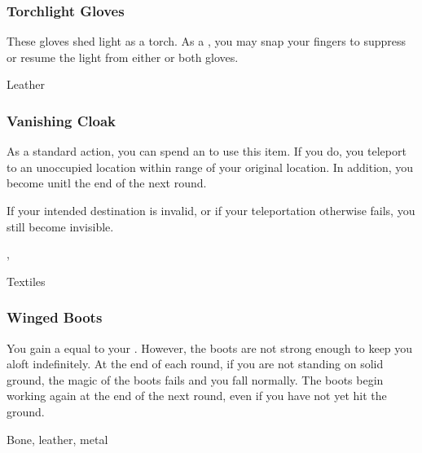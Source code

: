 \lowercase{\hypertarget{item:Torchlight Gloves}{}}\label{item:Torchlight Gloves}
\hypertarget{item:Torchlight Gloves}{\subsubsection{Torchlight Gloves\hfill{}}}

These gloves shed light as a torch.
As a , you may snap your fingers to suppress or resume the light from either or both gloves.



 


 Leather


\lowercase{\hypertarget{item:Vanishing Cloak}{}}\label{item:Vanishing Cloak}
\hypertarget{item:Vanishing Cloak}{\subsubsection{Vanishing Cloak\hfill{}}}

As a standard action, you can spend an  to use this item.
If you do, you teleport to an unoccupied location within \rngmed range of your original location.
In addition, you become  unitl the end of the next round.

If your intended destination is invalid, or if your teleportation otherwise fails, you still become invisible.



 , 


 Textiles


\lowercase{\hypertarget{item:Winged Boots}{}}\label{item:Winged Boots}
\hypertarget{item:Winged Boots}{\subsubsection{Winged Boots\hfill{}}}

You gain a  equal to your .
However, the boots are not strong enough to keep you aloft indefinitely.
At the end of each round, if you are not standing on solid ground, the magic of the boots fails and you fall normally.
The boots begin working again at the end of the next round, even if you have not yet hit the ground.



 Bone, leather, metal
